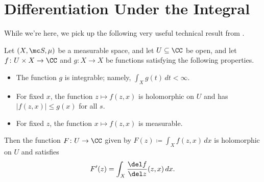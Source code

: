 \documentclass[notes.tex]{subfiles}
\begin{document}
\section{Differentiation Under the Integral}
While we're here, we pick up the following very useful technical result from \cite{mattner-diff-under-sign}.
\begin{proposition} \label{prop:diff-under-sign}
	Let $(X,\mc S,\mu)$ be a measurable space, and let $U\subseteq\CC$ be open, and let $f\colon U\times X\to\CC$ and $g\colon X\to X$ be functions satisfying the following properties.
	\begin{itemize}
		\item The function $g$ is integrable; namely, $\int_X g(t)\,dt<\infty$.
		\item For fixed $x$, the function $z\mapsto f(z,x)$ is holomorphic on $U$ and has $|f(z,x)|\le g(x)$ for all $s$.
		\item For fixed $z$, the function $x\mapsto f(z,x)$ is measurable.
	\end{itemize}
	Then the function $F\colon U\to\CC$ given by $F(z)\coloneqq\int_Xf(z,x)\,dx$ is holomorphic on $U$ and satisfies
	\[F'(z)=\int_X\frac{\del f}{\del z}(z,x)\,dx.\]
\end{proposition}
\end{document}
